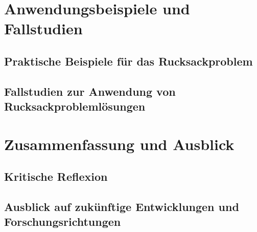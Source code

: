\documentclass[12pt]{report}
\begin{document}
\newpage
\chapter{Anwendungsbeispiele und Fallstudien}


\pagebreak
\section{Praktische Beispiele für das Rucksackproblem}

\pagebreak
\section{Fallstudien zur Anwendung von Rucksackproblemlösungen}


\newpage
\chapter{Zusammenfassung und Ausblick}

\pagebreak
\section{Kritische Reflexion}

\pagebreak
\section{Ausblick auf zukünftige Entwicklungen und Forschungsrichtungen}


\newpage
{}
\setcounter{page}{\value{frontmatterPage}} %
\addtocounter{page}{1}

\renewcommand{\refname}{Literaturverzeichnis}


\end{document}
